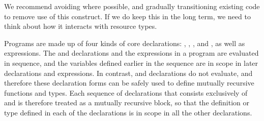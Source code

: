 \documentclass{article}
\begin{document}
\begin{mdP}[class={indent},data-line={417}]%
{}We recommend avoiding %
{}%
{} where possible, and gradually transitioning
existing %
{}%
{} code to remove use of this construct.  If we do keep this
in the long term, we need to think about how it interacts with resource
types.%
\end{mdP}%
\begin{mdP}[data-line={426}]%
{}Programs are made up of four kinds of core
declarations: %
{}%
{}, %
{}%
{}, %
{}%
{}, and %
{}%
{}, as well as expressions.
The %
{}%
{} and %
{}%
{} declarations and the expressions in a program
are evaluated
in sequence, and the variables defined earlier in the sequence are
in scope in later declarations and expressions.  In contrast,
{}%
{} and %
{}%
{} declarations do not evaluate, and therefore these
declaration forms can be safely used to define mutually recursive
functions and types.  Each sequence of declarations that consists
exclusively of %
{}%
{} and %
{}%
{} is therefore treated as a mutually
recursive block, so that the definition or type defined in each of
the declarations is in scope in all the other declarations.%
\end{mdP}%
\end{document}
